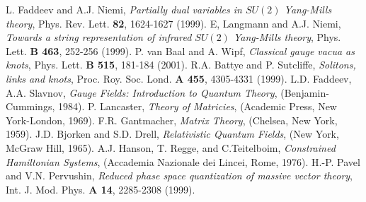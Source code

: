 \documentclass[a4paper,12pt]{article}
\begin{document}
\begin{thebibliography}{99}
L. Faddeev and A.J. Niemi,
{\it Partially dual variables in $SU(2)$ Yang-Mills theory},
Phys. Rev. Lett. {\bf 82}, 1624-1627 (1999).
%
E, Langmann and A.J. Niemi,
{\it Towards a string representation of infrared $SU(2)$ Yang-Mills theory},
Phys. Lett. {\bf B 463}, 252-256 (1999).
%
P. van Baal and A. Wipf,
{\it Classical gauge vacua as knots},
Phys. Lett. {\bf B 515}, 181-184 (2001).
%
R.A. Battye and P. Sutcliffe,
{\it Solitons, links and knots},
Proc. Roy. Soc. Lond. {\bf A 455}, 4305-4331 (1999).
%
%
L.D. Faddeev, A.A. Slavnov,
{\it Gauge Fields: Introduction to Quantum Theory},
(Benjamin-Cummings, 1984).
%
P. Lancaster,
{\it Theory of Matricies},
(Academic Press, New York-London, 1969).
%
F.R. Gantmacher,
{\it Matrix Theory},
(Chelsea, New York, 1959).
%
J.D. Bjorken and S.D. Drell,
{\it Relativistic Quantum Fields},
(New York, McGraw Hill, 1965).
%
A.J. Hanson, T. Regge, and C.Teitelboim,
{\it Constrained Hamiltonian Systems},
(Accademia Nazionale dei Lincei, Rome, 1976).
%
H.-P. Pavel and V.N. Pervushin,
{\it Reduced phase space quantization of massive vector theory},
Int. J. Mod. Phys. {\bf A 14}, 2285-2308 (1999).
\end{thebibliography}
\end{document}
